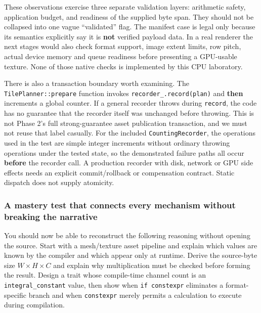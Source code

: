 These observations exercise three separate validation layers: arithmetic safety, application budget, and readiness of the supplied byte span. They should not be collapsed into one vague ``validated'' flag. The manifest case is legal only because its semantics explicitly say it is \textbf{not} verified payload data. In a real renderer the next stages would also check format support, image extent limits, row pitch, actual device memory and queue readiness before presenting a GPU-usable texture. None of those native checks is implemented by this CPU laboratory.

There is also a transaction boundary worth examining. The \texttt{TilePlanner::prepare} function invokes \texttt{recorder\_.record(plan)} and \textbf{then} increments a global counter. If a general recorder throws during \texttt{record}, the code has no guarantee that the recorder itself was unchanged before throwing. This is not Phase 2's full strong-guarantee asset publication transaction, and we must not reuse that label casually. For the included \texttt{CountingRecorder}, the operations used in the test are simple integer increments without ordinary throwing operations under the tested state, so the demonstrated failure paths all occur \textbf{before} the recorder call. A production recorder with disk, network or GPU side effects needs an explicit commit/rollback or compensation contract. Static dispatch does not supply atomicity.

\subsubsection{A mastery test that connects every mechanism without breaking the narrative}\label{a-mastery-test-that-connects-every-mechanism-without-breaking-the-narrative}

You should now be able to reconstruct the following reasoning without opening the source. Start with a mesh/texture asset pipeline and explain which values are known by the compiler and which appear only at runtime. Derive the source-byte size \(W\times H\times C\) and explain why multiplication must be checked before forming the result. Design a trait whose compile-time channel count is an \texttt{integral\_constant} value, then show when \texttt{if\ constexpr} eliminates a format-specific branch and when \texttt{constexpr} merely permits a calculation to execute during compilation.

